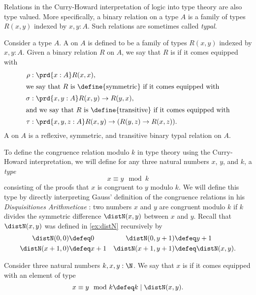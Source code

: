 Relations in the Curry-Howard interpretation of logic into type theory are also type valued. More specifically, a binary relation on a type $A$ is a family of types $R(x,y)$ indexed by $x,y:A$. Such relations are sometimes called \emph{typal}.

\begin{defn}
  Consider a type $A$. A  on $A$ is defined to be a family of types $R(x,y)$ indexed by $x,y:A$. Given a binary relation $R$ on $A$, we say that $R$ is  if it comes equipped with
  \begin{align*}
    \rho & : \prd{x:A}R(x,x), \\
    \intertext{we say that $R$ is \define{symmetric} if it comes equipped with}
    \sigma & : \prd{x,y:A} R(x,y)\to R(y,x), \\
    \intertext{and we say that $R$ is \define{transitive} if it comes equipped with}
    \tau & : \prd{x,y,z:A} R(x,y)\to (R(y,z)\to R(x,z)).
  \end{align*}
  A  on $A$ is a reflexive, symmetric, and transitive binary typal relation on $A$.
\end{defn}

To define the congruence relation modulo $k$ in type theory using the Curry-Howard interpretation, we will define for any three natural numbers $x$, $y$, and $k$, a \emph{type}
\begin{equation*}
  x\equiv y\mod k
\end{equation*}
consisting of the proofs that $x$ is congruent to $y$ modulo $k$. We will define this type by directly interpreting Gauss' definition of the congruence relations in his \emph{Disquisitiones Arithmeticae} \cite{Gauss}: two numbers $x$ and $y$ are congruent modulo $k$ if $k$ divides the symmetric difference $\distN(x,y)$ between $x$ and $y$. Recall that $\distN(x,y)$ was defined in \cref{ex:distN} recursively by
  \begin{align*}
    \distN(0,0) & \defeq 0 & \distN(0,y+1) & \defeq y+1 \\
    \distN(x+1,0) & \defeq x+1 & \distN(x+1,y+1) & \defeq \distN(x,y).
  \end{align*}

\begin{defn}
  Consider three natural numbers $k,x,y:\N$. We say that $x$ is  if it comes equipped with an element of type
  \begin{equation*}
    x\equiv y \mod k \defeq k\mid\distN(x,y).
  \end{equation*}
\end{defn}

